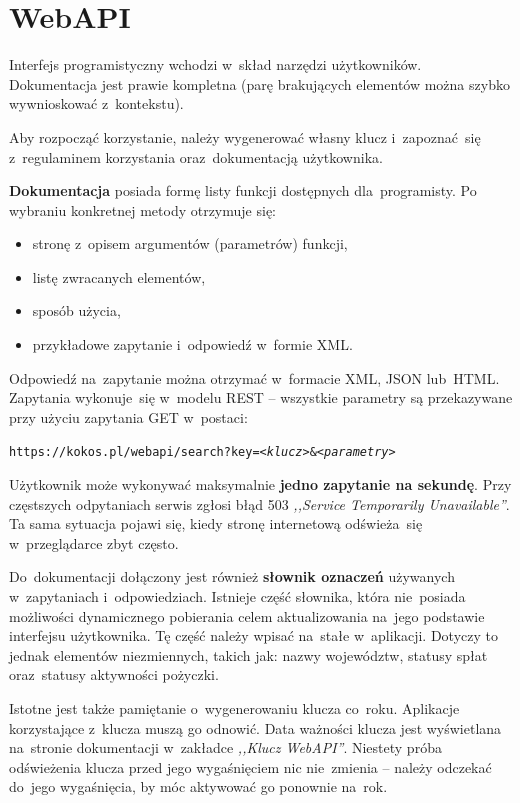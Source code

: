 \documentclass[a4paper,twoside,titlepage,openright]{book}
\begin{document}
\section{WebAPI}

Interfejs programistyczny wchodzi w~skład narzędzi użytkowników. Dokumentacja \cite{kokosPlApi} jest prawie kompletna (parę brakujących elementów można szybko wywnioskować z~kontekstu). 

Aby rozpocząć korzystanie, należy wygenerować własny klucz i~zapoznać~się z~regulaminem korzystania oraz~dokumentacją użytkownika. 

\textbf{Dokumentacja} posiada formę listy funkcji dostępnych dla~programisty. Po wybraniu konkretnej metody otrzymuje się:

\begin{itemize}
\item stronę z~opisem argumentów (parametrów) funkcji,
\item listę zwracanych elementów,
\item sposób użycia, 
\item przykładowe zapytanie i~odpowiedź w~formie XML.
\end{itemize}

Odpowiedź na~zapytanie można otrzymać w~formacie XML, JSON lub~HTML. Zapytania wykonuje~się w~modelu REST -- wszystkie parametry są przekazywane przy użyciu zapytania GET w~postaci:  

\begin{center}
\texttt{https://kokos.pl/webapi/search?key=\textit{<klucz>}\&\textit{<parametry>}}
\end{center}

Użytkownik może wykonywać maksymalnie \textbf{jedno zapytanie na sekundę}. Przy częstszych odpytaniach serwis zgłosi błąd 503 \textit{,,Service Temporarily Unavailable''}. Ta sama sytuacja pojawi się, kiedy stronę internetową odświeża~się w~przeglądarce zbyt często. 

Do~dokumentacji dołączony jest również \textbf{słownik oznaczeń} używanych w~zapytaniach i~odpowiedziach. Istnieje część słownika, która nie~posiada możliwości dynamicznego pobierania celem aktualizowania na~jego podstawie interfejsu użytkownika. Tę część należy wpisać na~stałe w~aplikacji. Dotyczy to jednak elementów niezmiennych, takich jak: nazwy województw, statusy spłat oraz~statusy aktywności pożyczki. 

Istotne jest także pamiętanie o~wygenerowaniu klucza co~roku. Aplikacje korzystające z~klucza muszą go odnowić. Data ważności klucza jest wyświetlana na~stronie dokumentacji w~zakładce \textit{,,Klucz WebAPI''}. Niestety próba odświeżenia klucza przed jego wygaśnięciem nic nie~zmienia -- należy odczekać do~jego wygaśnięcia, by móc aktywować go ponownie na~rok. 
\end{document}
